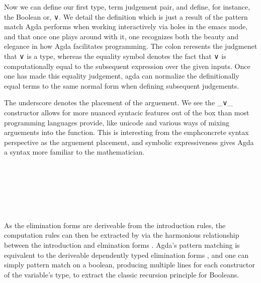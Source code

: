 Now we can define our first type, term judgement pair, and define, for instance,
the Boolean or, ∨. We detail the definition which is just a result of the
pattern match Agda performs when working interactively via holes in the emacs
mode, and that once one plays around with it, one recognizes both the beauty and
elegance in how Agda facilitates programming. The colon
reresents the judgmenet that ∨ is a type, whereas the equality symbol denotes
the fact that ∨ is computationally equal to the subsequent expression over the
given inputs. Once one has made this equality judgement, agda can normalize the
definitionally equal terms to the same normal form when defining subsequent
judgements.

The underscore denotes the placement of the arguement. We see the _∨_
constructor allows for more nuanced syntacic features out of the box than most
programming languages provide, like unicode and various ways of mixing
arguements into the function. This is interesting from the emph{concrete syntax}
perspective as the arguement placement, and symbolic expressiveness gives Agda a
syntax more familiar to the mathematician.

\begin{code}%
\>[0]\<%
\\
\>[0]\AgdaSpace{}%
\AgdaSymbol{:}\AgdaSpace{}%
\AgdaSpace{}%
\AgdaSpace{}%
\AgdaSpace{}%
\AgdaSpace{}%
\<%
\\
\>[0]%
\>[6]\AgdaSpace{}%
%
\>[14]\AgdaSymbol{=}\AgdaSpace{}%
\<%
\\
\>[0]\AgdaSpace{}%
\AgdaSpace{}%
%
\>[14]\AgdaSymbol{=}\AgdaSpace{}%
\<%
\\
\>[0]\AgdaSpace{}%
\AgdaSpace{}%
\AgdaSpace{}%
\AgdaSymbol{=}\AgdaSpace{}%
\<%
\\
\>[0]\<%
\end{code}


As the elimination forms are deriveable from the introduction rules, the
computation rules can then be extracted by via the harmonious relationship
between the introduction and elmination forms \cite{pfenningHar}. Agda's pattern
matching is equivalent to the deriveable dependently typed elimination forms
\cite{coqPat}, and one can simply pattern match on a boolean, producing multiple
lines for each constructor of the variable's type, to extract the classic
recursion principle for Booleans.


